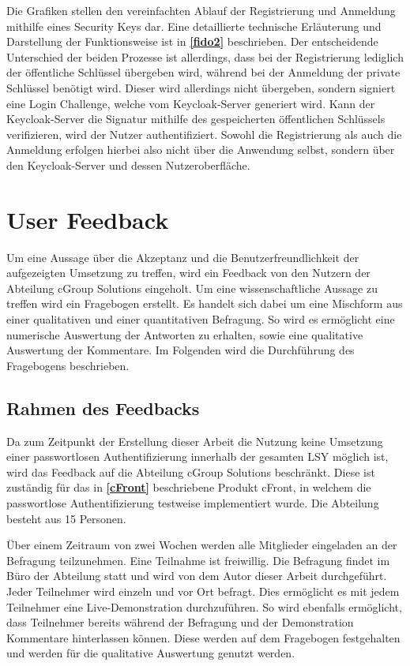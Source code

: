 Die Grafiken stellen den vereinfachten Ablauf der Registrierung und Anmeldung mithilfe eines Security Keys dar. Eine detaillierte technische Erläuterung und Darstellung der Funktionsweise ist in \textbf{\ref{fido2}} beschrieben. Der entscheidende Unterschied der beiden Prozesse ist allerdings, dass bei der Registrierung lediglich der öffentliche Schlüssel übergeben wird, während bei der Anmeldung der private Schlüssel benötigt wird. Dieser wird allerdings nicht übergeben, sondern signiert eine Login Challenge, welche vom Keycloak-Server generiert wird. Kann der Keycloak-Server die Signatur mithilfe des gespeicherten öffentlichen Schlüssels verifizieren, wird der Nutzer authentifiziert. Sowohl die Registrierung als auch die Anmeldung erfolgen hierbei also nicht über die Anwendung selbst, sondern über den Keycloak-Server und dessen Nutzeroberfläche.

\section{User Feedback}
Um eine Aussage über die Akzeptanz und die Benutzerfreundlichkeit der aufgezeigten Umsetzung zu treffen, wird ein Feedback von den Nutzern der Abteilung cGroup Solutions eingeholt. Um eine wissenschaftliche Aussage zu treffen wird ein Fragebogen erstellt. Es handelt sich dabei um eine Mischform aus einer qualitativen und einer quantitativen Befragung. So wird es ermöglicht eine numerische Auswertung der Antworten zu erhalten, sowie eine qualitative Auswertung der Kommentare. Im Folgenden wird die Durchführung des Fragebogens beschrieben.

\subsection{Rahmen des Feedbacks}
Da zum Zeitpunkt der Erstellung dieser Arbeit die Nutzung keine Umsetzung einer passwortlosen Authentifizierung innerhalb der gesamten \ac{LSY} möglich ist, wird das Feedback auf die Abteilung cGroup Solutions beschränkt. Diese ist zuständig für das in \textbf{\ref{cFront}} beschriebene Produkt cFront, in welchem die passwortlose Authentifizierung testweise implementiert wurde. Die Abteilung besteht aus 15 Personen.

Über einem Zeitraum von zwei Wochen werden alle Mitglieder eingeladen an der Befragung teilzunehmen. Eine Teilnahme ist freiwillig. Die Befragung findet im Büro der Abteilung statt und wird von dem Autor dieser Arbeit durchgeführt. Jeder Teilnehmer wird einzeln und vor Ort befragt. Dies ermöglicht es mit jedem Teilnehmer eine Live-Demonstration durchzuführen. So wird ebenfalls ermöglicht, dass Teilnehmer bereits während der Befragung und der Demonstration Kommentare hinterlassen können. Diese werden auf dem Fragebogen festgehalten und werden für die qualitative Auswertung genutzt werden.

